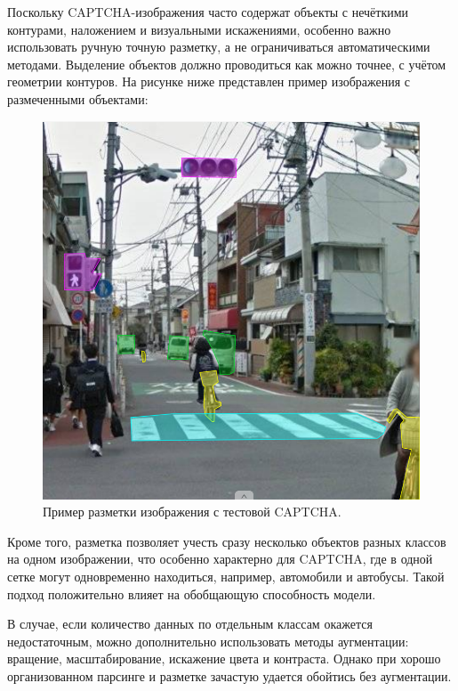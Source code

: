 Поскольку CAPTCHA-изображения часто содержат объекты с нечёткими контурами, наложением и визуальными искажениями, особенно важно использовать ручную точную разметку, а не ограничиваться автоматическими методами. Выделение объектов должно проводиться как можно точнее, с учётом геометрии контуров. На рисунке ниже представлен пример изображения с размеченными объектами:

\begin{figure}[H]
    \centering
    \includegraphics[width=0.9\linewidth]{imgs/captcha-poligons.png}
    \caption{Пример разметки изображения с тестовой CAPTCHA.}
    \label{fig:mask-captcha}
\end{figure}
\vspace{-0.5cm}

Кроме того, разметка позволяет учесть сразу несколько объектов разных классов на одном изображении, что особенно характерно для CAPTCHA, где в одной сетке могут одновременно находиться, например, автомобили и автобусы. Такой подход положительно влияет на обобщающую способность модели.

В случае, если количество данных по отдельным классам окажется недостаточным, можно дополнительно использовать методы аугментации: вращение, масштабирование, искажение цвета и контраста. Однако при хорошо организованном парсинге и разметке зачастую удается обойтись без аугментации.
